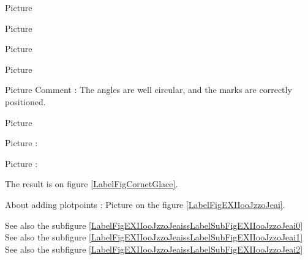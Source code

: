 Picture 
\begin{center}
   
\end{center}
   
		

Picture 
\begin{center}
   
\end{center}
   


Picture 
\begin{center}
   
\end{center}
   

\clearpage

Picture 
\begin{center}
   
\end{center}
   

Picture 
Comment : The angles are well circular, and the marks are correctly positioned.
\begin{center}
   
\end{center}


Picture 
\begin{center}
   
\end{center}
   


Picture : 
\begin{center}
   
\end{center}

Picture : 

The result is on figure \ref{LabelFigCornetGlace}. %
\newcommand{\CaptionFigCornetGlace}{<+Type your caption here+>}


\clearpage


About adding plotpoints : Picture  on the figure \ref{LabelFigEXIIooJzzoJeai}. %
\newcommand{\CaptionFigEXIIooJzzoJeai}{<+Type your caption here+>}

See also the subfigure \ref{LabelFigEXIIooJzzoJeaissLabelSubFigEXIIooJzzoJeai0}
See also the subfigure \ref{LabelFigEXIIooJzzoJeaissLabelSubFigEXIIooJzzoJeai1}
See also the subfigure \ref{LabelFigEXIIooJzzoJeaissLabelSubFigEXIIooJzzoJeai2}


